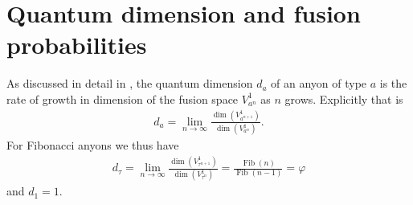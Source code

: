 \documentclass[a4paper,10pt,oneside]{book}
\theoremstyle{plain}
\newtheorem{corollary}[theorem]{Corollary}
\theoremstyle{definition}
\theoremstyle{remark}
\DeclareMathOperator{\Fib}{Fib}
\begin{document}












\section{Quantum dimension and fusion probabilities}

As discussed in detail in \cite{preskill}, the quantum dimension $d_a$ of an anyon of type $a$ is the rate of growth in dimension of the fusion space $V_{a^n}^1$ as $n$ grows.
Explicitly that is
\begin{align}
  d_a = \lim_{n\to\infty} \frac{\operatorname{dim}\left( V^1_{a^{n+1}} \right)}{\operatorname{dim}\left( V^1_{a^{n}} \right)}.
\end{align}
For Fibonacci anyons we thus have
\begin{align}
  d_\tau = \lim_{n\to\infty} \frac{\operatorname{dim}\left( V^1_{\tau^{n+1}} \right)}{\operatorname{dim}\left( V^1_{\tau^{n}} \right)}
  = \frac{\Fib(n)}{\Fib(n-1)} = \varphi
\end{align}
and $d_1 = 1$.
\end{document}
